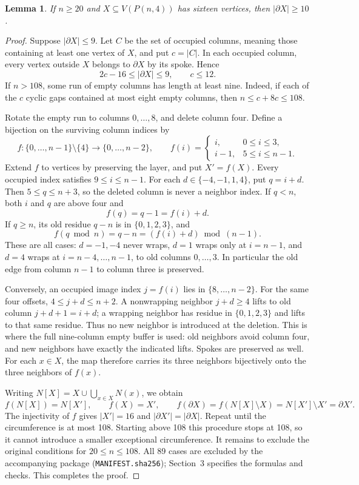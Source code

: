 \documentclass[10pt,a4paper]{article}
\newtheorem{lemma}[theorem]{Lemma}
\newcommand{\bd}{\partial}
\newcommand{\card}[1]{\lvert#1\rvert}
\begin{document}
\begin{lemma}\label{boundary}
If $n\ge20$ and $X\subseteq V(P(n,4))$ has sixteen vertices, then
$\card{\bd X}\ge10$.
\end{lemma}
\begin{proof}
Suppose $\card{\bd X}\le9$. Let $C$ be the set of occupied columns,
meaning those containing at least one vertex of $X$, and put $c=\card C$.
In each occupied column, every vertex outside $X$ belongs to $\bd X$
by its spoke. Hence
\[
2c-16\le\card{\bd X}\le9,\qquad c\le12.
\]
If $n>108$, some run of empty columns has length at least nine.
Indeed, if each of the $c$ cyclic gaps contained at most eight empty
columns, then $n\le c+8c\le108$.

Rotate the empty run to columns $0,\ldots,8$, and delete column four.
Define a bijection on the surviving column indices by
\[
f:\{0,\ldots,n-1\}\setminus\{4\}\longrightarrow\{0,\ldots,n-2\},
\qquad
f(i)=\begin{cases}i,&0\le i\le3,\\ i-1,&5\le i\le n-1.\end{cases}
\]
Extend $f$ to vertices by preserving the layer, and put $X'=f(X)$.
Every occupied index satisfies $9\le i\le n-1$. For each
$d\in\{-4,-1,1,4\}$, put $q=i+d$. Then $5\le q\le n+3$, so the
deleted column is never a neighbor index. If $q<n$, both $i$ and $q$
are above four and
\[
f(q)=q-1=f(i)+d.
\]
If $q\ge n$, its old residue $q-n$ is in $\{0,1,2,3\}$, and
\[
f(q\bmod n)=q-n=(f(i)+d)\bmod(n-1).
\]
These are all cases: $d=-1,-4$ never wraps, $d=1$ wraps only at $i=n-1$,
and $d=4$ wraps at $i=n-4,\ldots,n-1$, to old columns $0,\ldots,3$.
In particular the old edge from column $n-1$ to column three is preserved.

Conversely, an occupied image index $j=f(i)$ lies in $\{8,\ldots,n-2\}$.
For the same four offsets, $4\le j+d\le n+2$. A nonwrapping neighbor
$j+d\ge4$ lifts to old column $j+d+1=i+d$; a wrapping neighbor has
residue in $\{0,1,2,3\}$ and lifts to that same residue. Thus no new
neighbor is introduced at the deletion. This is where the full nine-column
empty buffer is used: old neighbors avoid column four, and new neighbors
have exactly the indicated lifts. Spokes are preserved as well. For each
$x\in X$, the map therefore carries its three neighbors bijectively onto
the three neighbors of $f(x)$.

Writing $N[X]=X\cup\bigcup_{x\in X}N(x)$, we obtain
\[
f(N[X])=N[X'],\qquad f(X)=X',\qquad
f(\bd X)=f(N[X]\setminus X)=N[X']\setminus X'=\bd X'.
\]
The injectivity of $f$ gives
$\card{X'}=16$ and $\card{\bd X'}=\card{\bd X}$.
Repeat until the circumference is at most 108. Starting above 108 this
procedure stops at 108, so it cannot introduce a smaller exceptional
circumference. It remains to exclude the original conditions for
$20\le n\le108$. All 89 cases are excluded by the accompanying package
(\texttt{MANIFEST.sha256}); Section~3 specifies the formulas and checks.
This completes the proof.
\end{proof}
\end{document}
